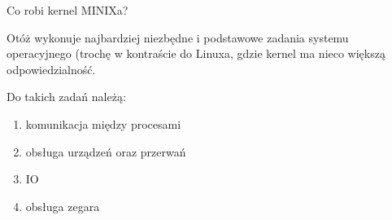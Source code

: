 Co robi kernel MINIXa?

Otóż wykonuje najbardziej niezbędne i podstawowe zadania systemu operacyjnego (trochę w kontraście do Linuxa, gdzie kernel ma nieco większą odpowiedzialność.

Do takich zadań należą:
\begin{enumerate}
	\item komunikacja między procesami
	\item obsługa urządzeń oraz przerwań
	\item IO
	\item obsługa zegara
\end{enumerate}
